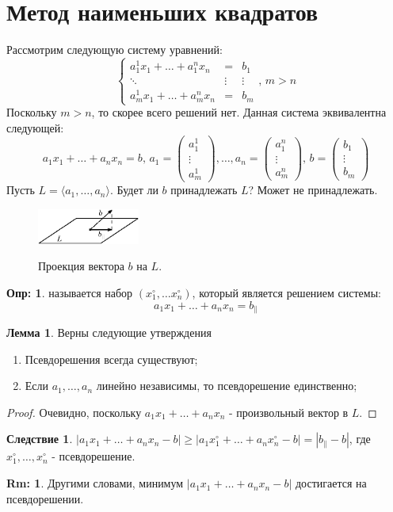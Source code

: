 \documentclass[12pt]{article}
\theoremstyle{definition}
\newtheorem{defn}{Опр:}
\newtheorem{rem}{Rm:}
\newtheorem{lemma}{Лемма}
\newtheorem{corollary}{Следствие}
\begin{document}
\section*{Метод наименьших квадратов}
Рассмотрим следующую систему уравнений:
$$
	\left\{
		\begin{matrix}
			a_1^1 x_1 + \dotsc + a_1^n x_n & = & b_1 \\
			\ddots & \vdots & \vdots \\
			a_m^1 x_1 + \dotsc + a_m^n x_n & = & b_m
		\end{matrix}
	\right., \, m > n
$$
Поскольку $m > n$, то скорее всего решений нет. Данная система эквивалентна следующей:
$$
	a_1 x_1 + \dotsc + a_n x_n = b, \, a_1 = 
	\begin{pmatrix}
		a_1^1 \\
		\vdots \\
		a_m^1
	\end{pmatrix}, \dotsc, a_n = 
	\begin{pmatrix}
		a_1^n \\
		\vdots \\
		a_m^n
	\end{pmatrix}, \, b = 
	\begin{pmatrix}
		b_1 \\
		\vdots \\
		b_m
	\end{pmatrix}	
$$
Пусть $L = \langle a_1 ,\dotsc, a_n \rangle$. Будет ли $b$ принадлежать $L$? Может не принадлежать.
\begin{figure}[H]
	\centering
	\includegraphics[width=0.3\textwidth]{7_5.eps}
	\label{7_5}
	\caption{Проекция вектора $b$ на $L$.}
	\label{fig:Проекция вектора $b$ на $L$}
\end{figure}
\begin{defn}
	 называется набор $(x_1^\circ, \dotsc x_n^\circ)$, который является решением системы: 
	$$
		a_1 x_1 + \dotsc + a_n x_n = b_{\|}
	$$
\end{defn}
\begin{lemma}Верны следующие утверждения
	\begin{enumerate}[label ={(\arabic*)}]
		\item Псевдорешения всегда существуют; 
		\item Если $a_1, \dotsc, a_n$ линейно независимы, то псевдорешение единственно;
	\end{enumerate}
\end{lemma}
\begin{proof}
	Очевидно, поскольку $a_1 x_1 + \dotsc + a_n x_n$ - произвольный вектор в $L$.
\end{proof}

\begin{corollary}
	$|a_1 x_1 + \dotsc + a_n x_n - b| \geq |a_1 x_1^\circ + \dotsc + a_n x_n^\circ - b| = |b_{\|} - b|$, где $x_1^\circ, \dotsc, x_n^\circ$ - псевдорешение.
\end{corollary}
\begin{rem}
	Другими словами, минимум $|a_1 x_1 + \dotsc + a_n x_n - b|$ достигается на псевдорешении.
\end{rem}
\end{document}
